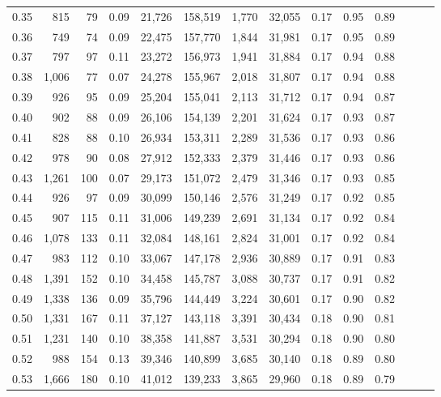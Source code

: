 \begin{tabular}{rrrrrrrrrrrrrr}
0.35 &    815 &     79 &  0.09 &   21,726 &  158,519 &   1,770 &  32,055 &  0.17 &  0.95 &      0.89 \\
0.36 &    749 &     74 &  0.09 &   22,475 &  157,770 &   1,844 &  31,981 &  0.17 &  0.95 &      0.89 \\
0.37 &    797 &     97 &  0.11 &   23,272 &  156,973 &   1,941 &  31,884 &  0.17 &  0.94 &      0.88 \\
0.38 &  1,006 &     77 &  0.07 &   24,278 &  155,967 &   2,018 &  31,807 &  0.17 &  0.94 &      0.88 \\
0.39 &    926 &     95 &  0.09 &   25,204 &  155,041 &   2,113 &  31,712 &  0.17 &  0.94 &      0.87 \\
0.40 &    902 &     88 &  0.09 &   26,106 &  154,139 &   2,201 &  31,624 &  0.17 &  0.93 &      0.87 \\
0.41 &    828 &     88 &  0.10 &   26,934 &  153,311 &   2,289 &  31,536 &  0.17 &  0.93 &      0.86 \\
0.42 &    978 &     90 &  0.08 &   27,912 &  152,333 &   2,379 &  31,446 &  0.17 &  0.93 &      0.86 \\
0.43 &  1,261 &    100 &  0.07 &   29,173 &  151,072 &   2,479 &  31,346 &  0.17 &  0.93 &      0.85 \\
0.44 &    926 &     97 &  0.09 &   30,099 &  150,146 &   2,576 &  31,249 &  0.17 &  0.92 &      0.85 \\
0.45 &    907 &    115 &  0.11 &   31,006 &  149,239 &   2,691 &  31,134 &  0.17 &  0.92 &      0.84 \\
0.46 &  1,078 &    133 &  0.11 &   32,084 &  148,161 &   2,824 &  31,001 &  0.17 &  0.92 &      0.84 \\
0.47 &    983 &    112 &  0.10 &   33,067 &  147,178 &   2,936 &  30,889 &  0.17 &  0.91 &      0.83 \\
0.48 &  1,391 &    152 &  0.10 &   34,458 &  145,787 &   3,088 &  30,737 &  0.17 &  0.91 &      0.82 \\
0.49 &  1,338 &    136 &  0.09 &   35,796 &  144,449 &   3,224 &  30,601 &  0.17 &  0.90 &      0.82 \\
0.50 &  1,331 &    167 &  0.11 &   37,127 &  143,118 &   3,391 &  30,434 &  0.18 &  0.90 &      0.81 \\
0.51 &  1,231 &    140 &  0.10 &   38,358 &  141,887 &   3,531 &  30,294 &  0.18 &  0.90 &      0.80 \\
0.52 &    988 &    154 &  0.13 &   39,346 &  140,899 &   3,685 &  30,140 &  0.18 &  0.89 &      0.80 \\
0.53 &  1,666 &    180 &  0.10 &   41,012 &  139,233 &   3,865 &  29,960 &  0.18 &  0.89 &      0.79 \\

\end{tabular}
